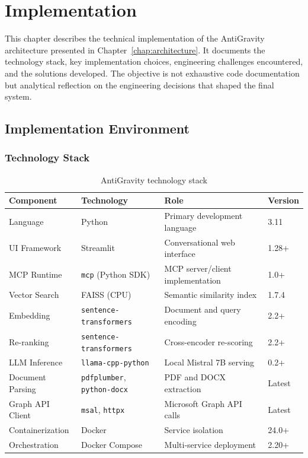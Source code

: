 \chapter{Implementation}
\label{chap:implementation}

This chapter describes the technical implementation of the AntiGravity architecture presented in Chapter~\ref{chap:architecture}. It documents the technology stack, key implementation choices, engineering challenges encountered, and the solutions developed. The objective is not exhaustive code documentation but analytical reflection on the engineering decisions that shaped the final system.

\section{Implementation Environment}
\label{sec:impl-environment}

\subsection{Technology Stack}

\begin{table}[H]
\centering
\caption{AntiGravity technology stack}
\label{tab:tech-stack}
\begin{tabularx}{\textwidth}{@{}llXl@{}}
\toprule
\textbf{Component} & \textbf{Technology} & \textbf{Role} & \textbf{Version} \\
\midrule
Language & Python & Primary development language & 3.11 \\
UI Framework & Streamlit & Conversational web interface & 1.28+ \\
MCP Runtime & \texttt{mcp} (Python SDK) & MCP server/client implementation & 1.0+ \\
Vector Search & FAISS (CPU) & Semantic similarity index & 1.7.4 \\
Embedding & \texttt{sentence-transformers} & Document and query encoding & 2.2+ \\
Re-ranking & \texttt{sentence-transformers} & Cross-encoder re-scoring & 2.2+ \\
LLM Inference & \texttt{llama-cpp-python} & Local Mistral 7B serving & 0.2+ \\
Document Parsing & \texttt{pdfplumber}, \texttt{python-docx} & PDF and DOCX extraction & Latest \\
Graph API Client & \texttt{msal}, \texttt{httpx} & Microsoft Graph API calls & Latest \\
Containerization & Docker & Service isolation & 24.0+ \\
Orchestration & Docker Compose & Multi-service deployment & 2.20+ \\
\bottomrule
\end{tabularx}
\end{table}

